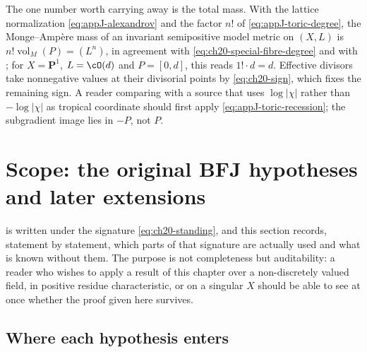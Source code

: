\begin{example}
The one number worth carrying away is the total mass.  With the lattice
normalization \eqref{eq:appJ-alexandrov} and the factor $n!$ of
\eqref{eq:appJ-toric-degree}, the Monge--Amp\`ere mass of an invariant
semipositive model metric on $(X,L)$ is
$n!\operatorname{vol}_M(P)=(L^n)$, in agreement with
\eqref{eq:ch20-special-fibre-degree} and with
; for $X=\mathbf P^1$, $L=\cO(d)$ and
$P=[0,d]$, this reads $1!\cdot d=d$.  Effective divisors take
nonnegative values at their divisorial points by \eqref{eq:ch20-sign}, which
fixes the remaining sign.  A reader comparing with a source that uses
$\log|\chi|$ rather than $-\log|\chi|$ as tropical coordinate should
first apply \eqref{eq:appJ-toric-recession}; the subgradient image lies in
$-P$, not $P$.
\end{example}

\section{Scope: the original BFJ hypotheses and later extensions}
\label{sec:ch20-scope}

 is written under the signature
\eqref{eq:ch20-standing}, and this section records, statement by statement,
which parts of that signature are actually used and what is known without
them.  The purpose is not completeness but auditability: a reader who
wishes to apply a result of this chapter over a non-discretely valued field,
in positive residue characteristic, or on a singular $X$ should be able to
see at once whether the proof given here survives.

\subsection{Where each hypothesis enters}
\label{sec:ch20-hypothesis-use}

